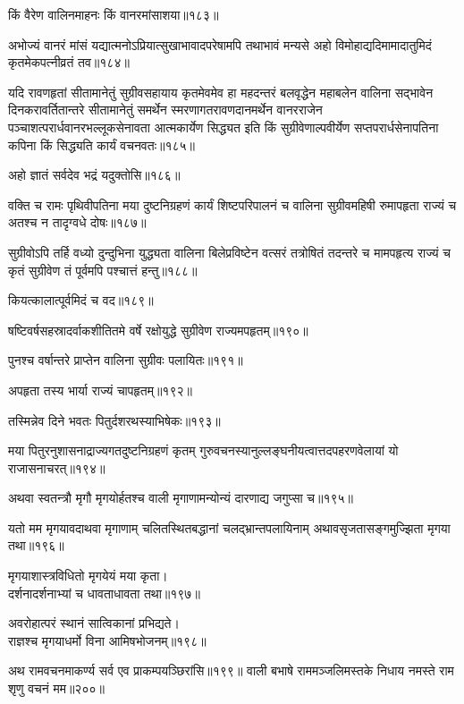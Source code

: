 \begin{flushleft}
किं वैरेण वालिनमाहनः किं वानरमांसाशया॥१८३॥

अभोज्यं वानरं मांसं यद्यात्मनोऽप्रियात्सुखाभावादपरेषामपि तथाभावं मन्यसे अहो विमोहाद्यदिमामादातुमिदं कृतमेकपत्नीव्रतं तव॥१८४॥

यदि रावणहृतां सीतामानेतुं सुग्रीवसहायाय कृतमेवमेव हा महदन्तरं बलवृद्धेन महाबलेन वालिना सद्भावेन दिनकरावर्तितान्तरे सीतामानेतुं समर्थेन स्मरणागतरावणदानमर्थेन वानरराजेन पञ्चाशत्परार्धवानरभल्लूकसेनावता आत्मकार्येण सिद्ध्यत इति किं सुग्रीवेणाल्पवीर्येण सप्तपरार्धसेनापतिना कपिना किं सिद्ध्यति कार्यं वचनवतः॥१८५॥

अहो ज्ञातं सर्वदेव भद्रं यदुक्तोसि॥१८६॥

वक्ति च रामः पृथिवीपतिना मया दुष्टनिग्रहणं कार्यं शिष्टपरिपालनं च वालिना सुग्रीवमहिषी रुमापहृता राज्यं च अतश्च न तादृग्वधे दोषः॥१८७॥


सुग्रीवोऽपि तर्हि वध्यो दुन्दुभिना युद्ध्यता वालिना बिलेप्रविष्टेन वत्सरं तत्रोषितं तदन्तरे च मामपहृत्य राज्यं च कृतं सुग्रीवेण तं पूर्वमपि पश्चात्तं हन्तु॥१८८॥


कियत्कालात्पूर्वमिदं च वद॥१८९॥


षष्टिवर्षसहस्रादर्वाकशीतितमे वर्षे रक्षोयुद्धे सुग्रीवेण राज्यमपहृतम्॥१९०॥

पुनश्च वर्षान्तरे प्राप्तेन वालिना सुग्रीवः पलायितः॥१९१॥

अपहृता तस्य भार्या राज्यं चापहृतम्॥१९२॥

तस्मिन्नेव दिने भवतः पितुर्दशरथस्याभिषेकः॥१९३॥


मया पितुरनुशासनाद्राज्यगतदुष्टनिग्रहणं कृतम् गुरुवचनस्यानुल्लङ्घनीयत्वात्तदपहरणवेलायां यो राजासनाचरत्॥१९४॥

अथवा स्वतन्त्रौ मृगौ मृगयोर्हतश्च वाली मृगाणामन्योन्यं दारणाद्य जगुप्सा च॥१९५॥

यतो मम मृगयावदाथवा मृगाणाम् चलितस्थितबद्धानां चलद्भ्रान्तपलायिनाम् अथावसृजतासङ्गमुज्झिता मृगया तथा॥१९६॥

मृगयाशास्त्रविधितो मृगयेयं मया कृता।\\ 
दर्शनादर्शनाभ्यां च धावताधावता तथा॥१९७॥

अवरोहात्परं स्थानं सात्विकानां प्रभिद्यते।\\
राज्ञश्च मृगयाधर्मो विना आमिषभोजनम्॥१९८॥

अथ रामवचनमाकर्ण्य सर्व एव प्राकम्पयञ्छिरांसि॥१९९॥
वाली बभाषे राममञ्जलिमस्तके निधाय नमस्ते राम शृणु वचनं मम॥२००॥


\end{flushleft}
